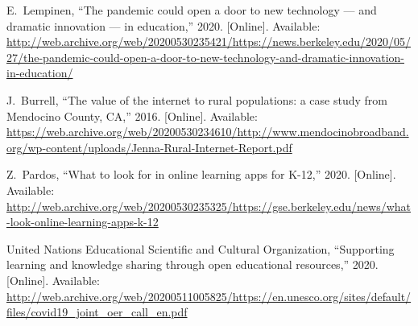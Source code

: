 \begin{thebibliography}{10}
\BIBentryALTinterwordspacing
E.~Lempinen, ``The pandemic could open a door to new technology — and
  dramatic innovation — in education,'' 2020. [Online]. Available:
  \url{http://web.archive.org/web/20200530235421/https://news.berkeley.edu/2020/05/27/the-pandemic-could-open-a-door-to-new-technology-and-dramatic-innovation-in-education/}
\BIBentrySTDinterwordspacing

\BIBentryALTinterwordspacing
J.~Burrell, ``{The value of the internet to rural populations: a case study
  from Mendocino County, CA},'' 2016. [Online]. Available:
  \url{https://web.archive.org/web/20200530234610/http://www.mendocinobroadband.org/wp-content/uploads/Jenna-Rural-Internet-Report.pdf}
\BIBentrySTDinterwordspacing

\BIBentryALTinterwordspacing
Z.~Pardos, ``{What to look for in online learning apps for K-12},'' 2020.
  [Online]. Available:
  \url{http://web.archive.org/web/20200530235325/https://gse.berkeley.edu/news/what-look-online-learning-apps-k-12}
\BIBentrySTDinterwordspacing

\BIBentryALTinterwordspacing
{United Nations Educational Scientific and Cultural Organization}, ``Supporting
  learning and knowledge sharing through open educational resources,'' 2020.
  [Online]. Available:
  \url{http://web.archive.org/web/20200511005825/https://en.unesco.org/sites/default/files/covid19_joint_oer_call_en.pdf}
\BIBentrySTDinterwordspacing

\end{thebibliography}






